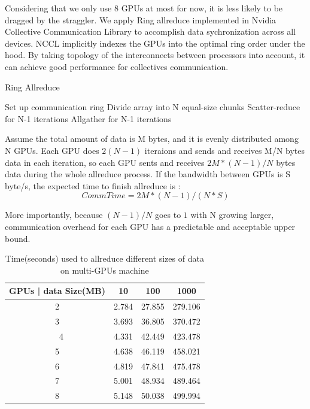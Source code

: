 Considering that we only use 8 GPUs at most for now, it is less likely to be dragged by the straggler. We apply Ring allreduce implemented in Nvidia Collective Communication Library\cite{jeaugey2017nccl} to accomplish data sychronization across all devices. NCCL implicitly indexes the GPUs into the optimal ring order under the hood. By taking topology of the interconnects between processors into account, it can achieve good performance for collectives communication.


\begin{algorithm}
    \caption{Ring Allreduce}
    \label{alg:ring-allreduce}
    \begin{algorithmic}[1]
        \State Set up communication ring
        \State Divide array into N equal-size chunks
        \State Scatter-reduce for N-1 iterations
        \State Allgather for N-1 iterations
    \end{algorithmic}
\end{algorithm}

Assume the total amount of data is M bytes, and it is evenly distributed among N GPUs. Each GPU does $2(N-1)$ iteraions and sends and receives M/N bytes data in each iteration, so each GPU sents and receives $2M*(N-1)/N$ bytes data during the whole allreduce process. If the bandwidth between GPUs is S byte/s, the expected time to finish allreduce is :
\begin{equation}
    CommTime = 2M*(N-1)/(N*S)
\end{equation}


 More importantly, because $(N-1)/N$ goes to $1$ with N growing larger, communication overhead for each GPU has a predictable and acceptable upper bound.

\begin{table}[h]
    
    \begin{tabular}{|c|c|c|c|}
        \hline GPUs | data Size(MB) & 10 & 100 & 1000 \\
        \hline  2 & 2.784 & 27.855 & 279.106 \\
        \hline  3 &	3.693 &	36.805 &	370.472 \\
        \hline　4 &	4.331 &	42.449 &	423.478 \\
        \hline  5 &	4.638 &	46.119 &	458.021 \\
        \hline  6 &	4.819 &	47.841 &	475.478 \\
        \hline  7 &	5.001 & 48.934 &	489.464 \\
        \hline  8 &	5.148 &	50.038 &	499.994 \\
        \hline
    \end{tabular}{}
    \caption{Time(seconds) used to allreduce different sizes of data on multi-GPUs machine}
    \label{tab:allreduce-overhead}
\end{table}


